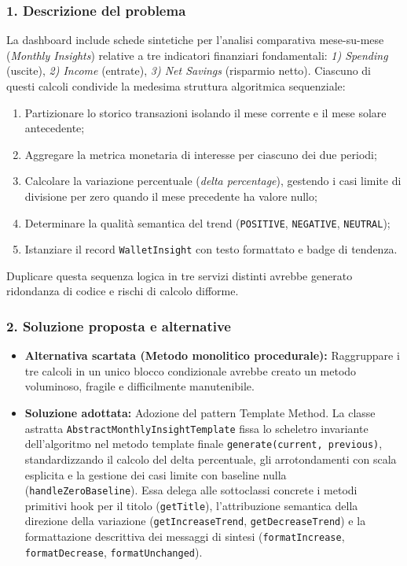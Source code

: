 \documentclass[11pt,a4paper,openright]{report}
\begin{document}
\subsubsection*{1. Descrizione del problema}
La dashboard include schede sintetiche per l'analisi comparativa mese-su-mese (\emph{Monthly Insights}) relative a tre indicatori finanziari fondamentali: \emph{1) Spending} (uscite), \emph{2) Income} (entrate), \emph{3) Net Savings} (risparmio netto).
Ciascuno di questi calcoli condivide la medesima struttura algoritmica sequenziale:
\begin{enumerate}[noitemsep,topsep=1pt,partopsep=0pt,parsep=0pt]
  \item Partizionare lo storico transazioni isolando il mese corrente e il mese solare antecedente;
  \item Aggregare la metrica monetaria di interesse per ciascuno dei due periodi;
  \item Calcolare la variazione percentuale (\emph{delta percentage}), gestendo i casi limite di divisione per zero quando il mese precedente ha valore nullo;
  \item Determinare la qualità semantica del trend (\texttt{POSITIVE}, \texttt{NEGATIVE}, \texttt{NEUTRAL});
  \item Istanziare il record \texttt{WalletInsight} con testo formattato e badge di tendenza.
\end{enumerate}
Duplicare questa sequenza logica in tre servizi distinti avrebbe generato ridondanza di codice e rischi di calcolo difforme.

\subsubsection*{2. Soluzione proposta e alternative}
\begin{itemize}[noitemsep,topsep=1pt,partopsep=0pt,parsep=0pt]
  \item \textbf{Alternativa scartata (Metodo monolitico procedurale):} Raggruppare i tre calcoli in un unico blocco condizionale avrebbe creato un metodo voluminoso, fragile e difficilmente manutenibile.
  \item \textbf{Soluzione adottata:} Adozione del pattern Template Method. La classe astratta \texttt{AbstractMonthlyInsightTemplate} fissa lo scheletro invariante dell'algoritmo nel metodo template finale \texttt{generate(current, previous)}, standardizzando il calcolo del delta percentuale, gli arrotondamenti con scala esplicita e la gestione dei casi limite con baseline nulla (\texttt{handleZeroBaseline}). Essa delega alle sottoclassi concrete i metodi primitivi hook per il titolo (\texttt{getTitle}), l'attribuzione semantica della direzione della variazione (\texttt{getIncreaseTrend}, \texttt{getDecreaseTrend}) e la formattazione descrittiva dei messaggi di sintesi (\texttt{formatIncrease}, \texttt{formatDecrease}, \texttt{formatUnchanged}).
\end{itemize}
\end{document}
